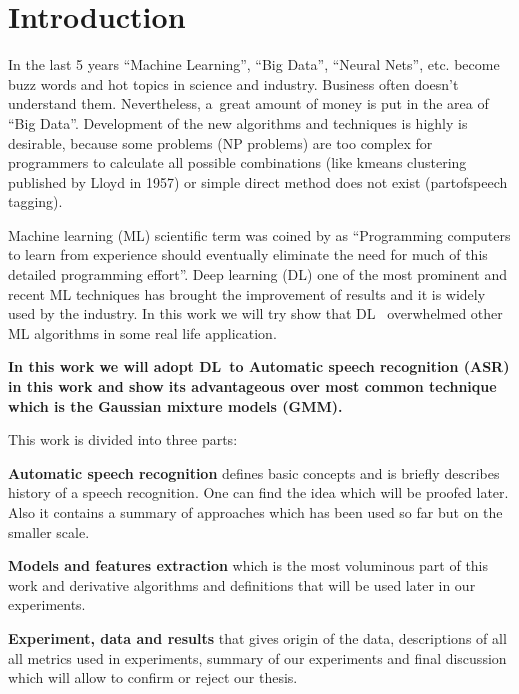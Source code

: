 
\chapter{Introduction}
In the last 5 years ``Machine Learning'', ``Big Data'', ``Neural Nets'', etc. become buzz words and hot topics in science and industry. Business often doesn't understand them. Nevertheless, a~great amount of money is put in the area of ``Big Data''. Development of the new algorithms and techniques is highly is desirable, because some problems (NP problems) are too complex for programmers to calculate all possible combinations (like k\dywiz means clustering published by Lloyd in 1957) or simple direct method does not exist (part\dywiz of\dywiz speech tagging).  

Machine learning (ML) scientific term was coined by \textcite{samuel} as ``Programming computers to learn from experience should eventually eliminate the need for much of this detailed programming effort''. Deep learning (DL) one of the most prominent and recent ML techniques has brought the improvement of results and it is widely used by the industry. In this work we will try show that DL~ overwhelmed other ML algorithms in some real life application.

\textbf{In this work we will adopt DL~to Automatic speech recognition (ASR) in this work and show its advantageous over most common technique which is the Gaussian mixture models (GMM).}

This work is divided into three parts:

\textbf{Automatic speech recognition} defines basic concepts and is briefly describes history of a speech recognition. One can find the idea which will be proofed later. Also it contains a summary of approaches which has been used so far but on the smaller scale.

\textbf{Models and features extraction} which is the most voluminous part of this work and derivative algorithms and definitions that will be used later in our experiments.

\textbf{Experiment, data and results} that gives origin of the data, descriptions of all all metrics used in experiments, summary of our experiments and final discussion which will allow to confirm or reject our thesis. 
	
